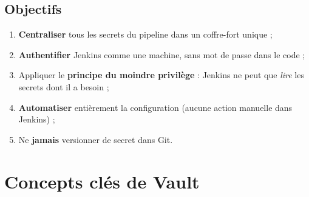 \documentclass[11pt,a4paper]{article}
\begin{document}
\subsection{Objectifs}

\begin{enumerate}[leftmargin=*]
  \item \textbf{Centraliser} tous les secrets du pipeline dans un coffre-fort unique ;
  \item \textbf{Authentifier} Jenkins comme une machine, sans mot de passe dans le code ;
  \item Appliquer le \textbf{principe du moindre privilège} : Jenkins ne peut que
        \emph{lire} les secrets dont il a besoin ;
  \item \textbf{Automatiser} entièrement la configuration (aucune action manuelle dans
        Jenkins) ;
  \item Ne \textbf{jamais} versionner de secret dans Git.
\end{enumerate}

\section{Concepts clés de Vault}
\end{document}

